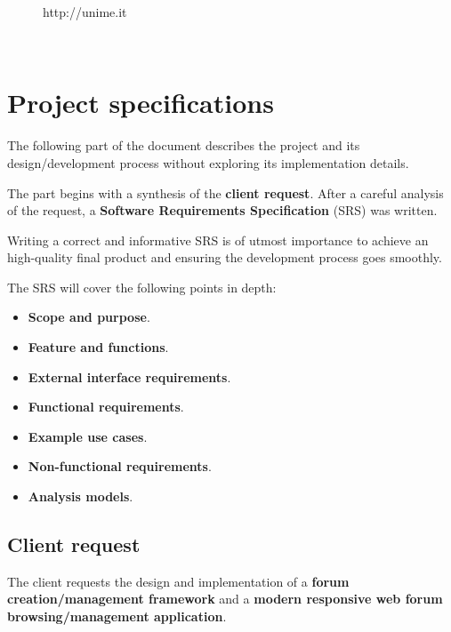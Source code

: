 \documentclass[12pt]{report}
\renewcommand\emph{\textbf}
\begin{document}
\begin{titlepage}
\begin{minipage}{\linewidth}
\begin{minipage}{0.35\linewidth}
\begin{figure}[H]
                    http://unime.it
                \end{figure}
            \end{minipage}
        \end{minipage}\\[3cm]
    \end{titlepage}

    \newcommand{\atoc}[1]{\addtocontents{toc}{#1\par}}
    \renewcommand{\thesection}{\arabic{section}.}
    \tableofcontents
    \newpage

    \part{Project specifications}
        The following part of the document describes the project and its design/development process without exploring its implementation details.

        The part begins with a synthesis of the \emph{client request}. After a careful analysis of the request, a \emph{Software Requirements Specification} (SRS) was written.

        Writing a correct and informative SRS is of utmost importance to achieve an high-quality final product and ensuring the development process goes smoothly.

        The SRS will cover the following points in depth:

        \begin{itemize}
            \item \emph{Scope and purpose}. 
            \item \emph{Feature and functions}. 
            \item \emph{External interface requirements}.
            \item \emph{Functional requirements}.
            \item \emph{Example use cases}.
            \item \emph{Non-functional requirements}.
            \item \emph{Analysis models}.
        \end{itemize}

        \chapter{Client request}

            The client requests the design and implementation of a \emph{forum creation/management framework} and a \emph{modern responsive web forum browsing/management application}.
\end{document}
